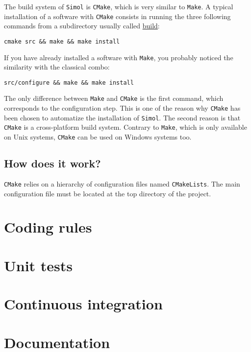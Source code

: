 \documentclass[12pt]{book}
\newcommand{\CMake}{\texttt{CMake}\xspace}
\newcommand{\CMakeLists}{\texttt{CMakeLists}\xspace}
\newcommand{\Make}{\texttt{Make}\xspace}
\newcommand{\Simol}{\texttt{Simol}\xspace}
\begin{document}
The build system of \Simol is \CMake, which is very similar to \Make. A typical installation of a software with \CMake consists in running the three following commands from a subdirectory usually called \url{build}: 
\lstset{language=bash} 
\begin{lstlisting}
cmake src && make && make install
\end{lstlisting}
If you have already installed a software with \Make, you probably noticed the similarity with the classical combo:
\lstset{language=bash} 
\begin{lstlisting}
src/configure && make && make install
\end{lstlisting}
The only difference between \Make and \CMake is the first command, which corresponds to the configuration step. This is one of the reason why \CMake has been chosen to automatize the installation of \Simol. The second reason is that \CMake is a cross-platform build system. Contrary to \Make, which is only available on Unix systems, \CMake can be used on Windows systems too.

\subsection{How does it work?}

\CMake relies on a hierarchy of configuration files named \CMakeLists. The main configuration file must be located at the top directory of the project.



\section{Coding rules}
\section{Unit tests}
\section{Continuous integration}
\section{Documentation}
\end{document}
